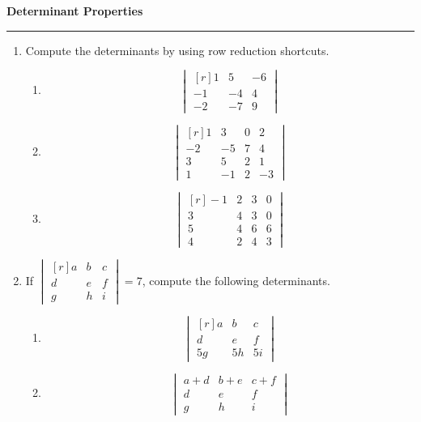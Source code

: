 \documentclass[12pt]{article}
\begin{document}
\begin{center}
{\bf \Large Determinant Properties}
\vspace{0.2cm}
\hrule
\end{center}

\begin{multicols*}{2}
	\begin{enumerate}
		\item Compute the determinants by using row reduction shortcuts.
		\begin{enumerate}
			\item \[
			\begin{vmatrix*}[r]
				1 & 5 & -6\\
				-1 & -4 & 4\\
				-2 & -7 & 9
			\end{vmatrix*}
			\]
			\vfill
			\item \[
			\begin{vmatrix*}[r]
				1 & 3 & 0 & 2\\
				-2 & -5 & 7 & 4\\
				3 & 5 & 2 & 1\\
				1 & -1 & 2 & -3
			\end{vmatrix*}
			\]
			\vfill
			\item \[
			\begin{vmatrix*}[r]
				-1 & 2 & 3 & 0\\
				3 & 4 & 3 & 0\\
				5 & 4 & 6 & 6\\
				4 & 2 & 4 & 3
			\end{vmatrix*}
			\]
			\vfill
		\end{enumerate}

		\item If $\begin{vmatrix*}[r]
			a & b & c\\
			d & e & f\\
			g & h & i
		\end{vmatrix*} = 7$, compute the following determinants.
		\begin{enumerate}
			\item \[
			\begin{vmatrix*}[r]
				a & b & c\\
				d & e & f\\
				5g & 5h & 5i
			\end{vmatrix*}
			\]
			\vfill

			\item \[
			\begin{vmatrix}
				a + d & b+e & c+f\\
				d & e & f\\
				g & h & i
			\end{vmatrix}
			\]
			\vfill


\end{enumerate}
\end{enumerate}
\end{multicols*}
\end{document}
